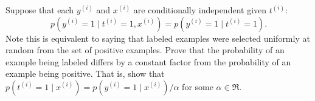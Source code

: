 \item {}
Suppose that each $y^{(i)}$ and $x^{(i)}$ are conditionally independent given
$t^{(i)}$:
%
\begin{equation*}
	p(y^{(i)} = 1\mid t^{(i)} = 1, x^{(i)}) = p(y^{(i)} = 1\mid t^{(i)} = 1).
\end{equation*}
%
Note this is equivalent to saying that labeled examples were selected uniformly
at random from the set of positive examples.
Prove that the probability of an example being labeled differs by a constant
factor from the probability of an example being positive. That is, show that
$p(t^{(i)} = 1\mid x^{(i)}) = p(y^{(i)} = 1\mid x^{(i)}) / \alpha$ for
some $\alpha\in\Re$.

\ifnum{}\fi
